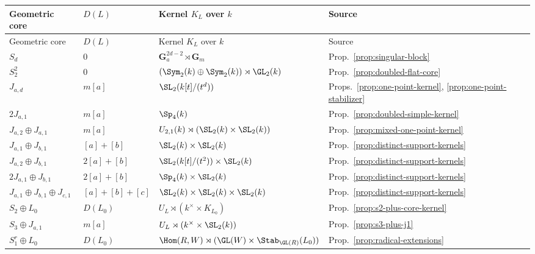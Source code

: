 \begin{longtable}{@{}L{0.22\textwidth} L{0.12\textwidth} L{0.38\textwidth} L{0.16\textwidth}@{}}
\toprule
Geometric core & \(D(L)\) & Kernel \(K_L\) over \(k\) & Source \\
\midrule
\endfirsthead
\toprule
Geometric core & \(D(L)\) & Kernel \(K_L\) over \(k\) & Source \\
\midrule
\endhead
\bottomrule
\endlastfoot
\(S_d\) &
\(0\) &
\(\mathbf G_a^{2d-2}\rtimes \mathbf G_m\) &
Prop.~\ref{prop:singular-block} \\
\(S_2^2\) &
\(0\) &
\((\Sym_2(k)\oplus \Sym_2(k))\rtimes \GL_2(k)\) &
Prop.~\ref{prop:doubled-flat-core} \\
\(J_{a,d}\) &
\(m[a]\) &
\(\SL_2(k[t]/(t^d))\) &
Props.~\ref{prop:one-point-kernel}, \ref{prop:one-point-stabilizer} \\
\(2J_{a,1}\) &
\(m[a]\) &
\(\Sp_4(k)\) &
Prop.~\ref{prop:doubled-simple-kernel} \\
\(J_{a,2}\oplus J_{a,1}\) &
\(m[a]\) &
\(U_{2,1}(k)\rtimes (\SL_2(k)\times \SL_2(k))\) &
Prop.~\ref{prop:mixed-one-point-kernel} \\
\(J_{a,1}\oplus J_{b,1}\) &
\([a]+[b]\) &
\(\SL_2(k)\times \SL_2(k)\) &
Prop.~\ref{prop:distinct-support-kernels} \\
\(J_{a,2}\oplus J_{b,1}\) &
\(2[a]+[b]\) &
\(\SL_2(k[t]/(t^2))\times \SL_2(k)\) &
Prop.~\ref{prop:distinct-support-kernels} \\
\(2J_{a,1}\oplus J_{b,1}\) &
\(2[a]+[b]\) &
\(\Sp_4(k)\times \SL_2(k)\) &
Prop.~\ref{prop:distinct-support-kernels} \\
\(J_{a,1}\oplus J_{b,1}\oplus J_{c,1}\) &
\([a]+[b]+[c]\) &
\(\SL_2(k)\times \SL_2(k)\times \SL_2(k)\) &
Prop.~\ref{prop:distinct-support-kernels} \\
\(S_2\oplus L_0\) &
\(D(L_0)\) &
\(U_L\rtimes (k^\times\times K_{L_0})\) &
Prop.~\ref{prop:s2-plus-core-kernel} \\
\(S_3\oplus J_{a,1}\) &
\(m[a]\) &
\(U_L\rtimes (k^\times\times \SL_2(k))\) &
Prop.~\ref{prop:s3-plus-j1} \\
\(S_1^r\oplus L_0\) &
\(D(L_0)\) &
\(\Hom(R,W)\rtimes (\GL(W)\times \Stab_{\GL(R)}(L_0))\) &
Prop.~\ref{prop:radical-extensions} \\
\end{longtable}
